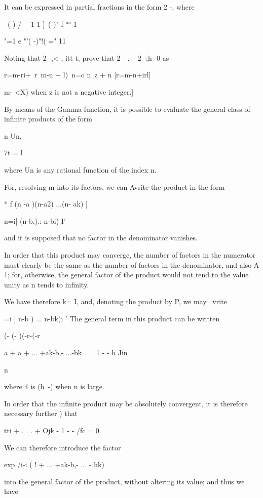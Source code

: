 It can be expressed in partial fractions in the form 2 -, where

\ (-) / \ \ 1 1 ]\ (-)" f °° 1

"=1 e "'( -)"!( =" 11

Noting that 2 -,<-, itt-t, prove that 2 - .- \ 2 -;h- 0 as

r=m-ri+\ r\ m-n + l)\ n=o n\ z + n [r=m-n+irl]

m- <X) when z is not a negative integer.]


By means of the Gamma-function, it is possible to evaluate the general
class of infinite products of the form

n Un,

7t = l

where Un is any rational function of the index n.

For, resolving m into its factors, we can Avrite the product in the
form

* f (n -a )(n-a2) ...(n- ak) ]

n=i[ (n-b,).: n-bi) I'

and it is supposed that no factor in the denominator vanishes.

In order that this product may converge, the number of factors in the
numerator must clearly be the same as the number of factors in the
denominator, and also A 1; for, otherwise, the general factor of the
product would not tend to the value unity as n tends to infinity.

We have therefore k= I, and, denoting the product by P, we may \ vrite

 =i ] n-b ) ... n-bk)i ' The general term in this product can be
written

(- (- )(-r-(-r

a + a + ... +ak-b,- ...-bk . = 1 - - h Jin

n

where 4 is (h~-) when n is large.

In order that the infinite product may be absolutely convergent, it is
therefore necessary further ) that

tti + . . . + Ojk - 1 -   - /fc = 0.

%
%

We can therefore introduce the factor

exp /i-i ( ! + ... +ak-b,- ... - hk)

into the general factor of the product, without altering its value;
and thus we have

